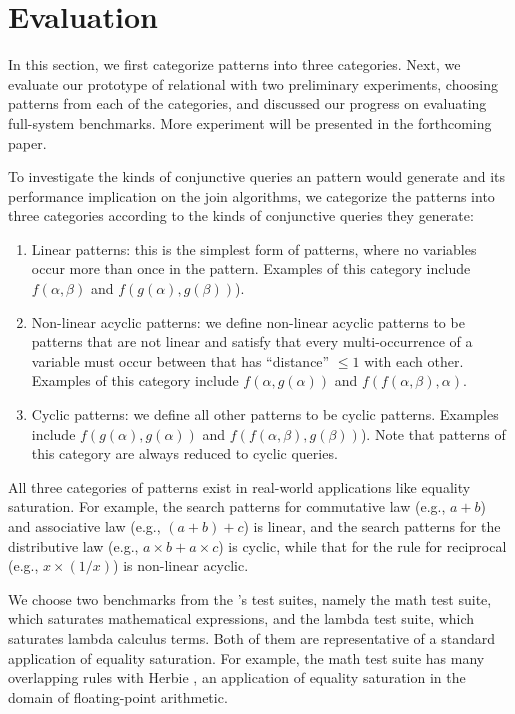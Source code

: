 \chapter{Evaluation}

In this section, we first categorize \ematching patterns into three categories. Next, we evaluate our prototype of relational \ematching with two preliminary experiments, choosing patterns from each of the categories, and discussed our progress on evaluating full-system benchmarks. More experiment will be presented in the forthcoming paper.


To investigate the kinds of conjunctive queries an \ematching pattern would generate and its performance implication on the join algorithms, we categorize the \ematching patterns into three categories according to the kinds of conjunctive queries they generate:
\begin{enumerate}
    \item Linear patterns: this is the simplest form of patterns, where no variables occur more than once in the pattern. Examples of this category include $f(\alpha, \beta)$ and $f(g(\alpha),g(\beta))$).
    \item Non-linear acyclic patterns: we define non-linear acyclic patterns to be patterns that are not linear and satisfy that every multi-occurrence of a variable must occur between \enodes that has ``distance'' $\leq 1$ with each other. Examples of this category include  $f(\alpha,g(\alpha))$ and $f(f(\alpha,\beta), \alpha)$.
    \item Cyclic patterns: we define all other patterns to be cyclic patterns. Examples include $f(g(\alpha), g(\alpha))$ and $f(f(\alpha,\beta), g(\beta))$). Note that \ematching patterns of this category are always reduced to cyclic queries.
\end{enumerate}

All three categories of patterns exist in real-world applications like equality saturation. 
For example, the search patterns for commutative law (e.g., $a+b$) and associative law (e.g., $(a+b)+c$) is linear, and the search patterns for the distributive law (e.g., $a\times b+a\times c$) is cyclic, while that for the rule for reciprocal (e.g., $x\times (1/x)$) is non-linear acyclic.


We choose two benchmarks from the \egg's test suites, namely the math test suite, which saturates mathematical expressions, and the lambda test suite, which saturates lambda calculus terms. Both of them are representative of a standard application of equality saturation. For example, the math test suite has many overlapping rules with Herbie \citep{herbie}, an application of equality saturation in the domain of floating-point arithmetic.

